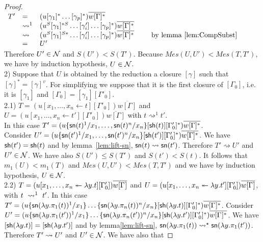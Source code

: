 \documentclass{llncs} %
\begin{document}
\begin{proof}
$
\begin{array}{llll}
 T' & = & (u[\gamma_1]^* \dots[\gamma_p]^*)\overline{w[\Gamma]^*} & \\
    & \rightsquigarrow^1 & (u^S[\gamma_1]^{*S} \dots [\gamma'_i]\dots [\gamma_p]^*)\overline{w[\Gamma]^*} & \\
    & \rightsquigarrow & (u^S[\gamma_1]^{S*} \dots [\gamma'_i]\dots [\gamma_p]^*)\overline{w[\Gamma]^*} & \hspace{0.5cm} \mbox{by lemma~\ref{lem:CompSubst}  }\\
    & = & U' &
\end{array}
$
\\
Therefore $U'\in\mathcal{N}$ and $S(U')<S(T')$. Because $Mes(U,U') < Mes(T,T')$, we have by induction hypothesis, $U\in\mathcal{N}$.
%
%
\medskip
\\
2) Suppose that $U$ is obtained by the reduction a closure $[\gamma]$ such that  $[\gamma]^* = [\gamma]^v$. For simplifying we suppose that it is the first closure of $[\Gamma_0]$, i.e. it is $[\gamma_1]$ and $[\Gamma_0] = [\gamma_1][\Gamma'_0]$.
\smallskip
\\
2.1)  $T = (u[x_1,\dots,x_n \leftarrow t][\Gamma'_0])\overline{w[\Gamma]}$ and $U = (u[x_1,\dots,x_n \leftarrow t'][\Gamma'_0])\overline{w[\Gamma]}$ with $t\rightsquigarrow^1 t'$.
\\
In this case $T' = (u\{{\mathsf{sn}}(t)^1/x_1,\dots,{\mathsf{sn}}(t)^n/x_n\}[{\mathsf{sh}} (t)][\Gamma'_0]^*)\overline{w[\Gamma]^*}$.
\\
Consider $U' = (u\{{\mathsf{sn}}(t')^1/x_1,\dots,{\mathsf{sn}}(t')^n/x_n\}[{\mathsf{sh}} (t')][\Gamma'_0]^*)\overline{w[\Gamma]^*}$. We have ${\mathsf{sh}} (t') = {\mathsf{sh}} (t)$ and by lemma~\ref{lem:lift-sn}, ${\mathsf{sn}} (t) \rightsquigarrow {\mathsf{sn}} (t')$. Therefore $T'\rightsquigarrow U'$ and $U'\in\mathcal{N}$. We have also $S(U')\leq S(T')$ and $S(t')<S(t)$. It follows that  $m_1(U) < m_1(T)$ and  $Mes(U,U') < Mes(T,T')$ and we have by induction hypothesis, $U\in\mathcal{N}$.
%
\smallskip
\\
2.2)  
$T =  (u\distr xyt[\Gamma_0'])\overline{w\G}$ and
$U =  (u\distr xy{t'}[\Gamma_0'])\overline{w\G}$, with $t ~\rewrite^1~ t'$.
In this case
$T' = (u\sub{x_1}{\sn(\lambda y.\pi_1(t))^1}\dots\sub{x_n}{\sn(\lambda
y.\pi_n(t))^n}[\sh(\lambda y.t)][\Gamma_0']^*)\overline{w\G^*}$.
Consider
$U' = (u\sub{x_1}{\sn(\lambda
y.\pi_1(t'))^1}\dots\sub{x_n}{\sn(\lambda y.\pi_n(t'))^n}[\sh(\lambda
y.t')][\Gamma_0']^*)\overline{w\G^*}$.
We have $[{\mathsf{sh}}(\lambda y.t)]=[{\mathsf{sh}}(\lambda y.t')]$ and by lemma\ref{lem:lift-sn},
$\sn(\lambda y.\pi_1(t)) \rewrite^\star \sn(\lambda y.\pi_1(t'))$.
Therefore $T'\rewrite U'$ and $U'\in\mathcal{N}$. We have also that

\end{proof}
\end{document}
